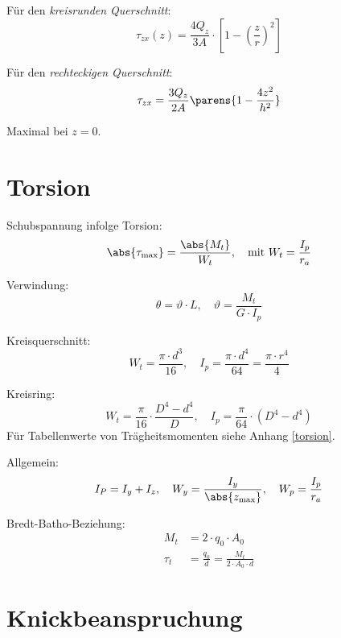 	Für den \emph{kreisrunden Querschnitt}:
	\begin{equation*}
		\tau_{zx}(z) = \frac{4Q_z}{3A}\cdot \left[ 1-\left( \frac{z}{r}\right)^2\right]
	\end{equation*}
	
	Für den \emph{rechteckigen Querschnitt}:
	\[
		\tau_{zx} = \frac{3 Q_z}{2A} \parens{1-\frac{4z^2}{h^2}}
	\]
	
	Maximal bei $z=0$.
	
\section{Torsion} %
	Schubspannung infolge Torsion:
	\begin{equation*}
		\abs{\tau_{\text{max}}} = \frac{\abs{M_t}}{W_t}, \quad \text{mit } W_t = \frac{I_p}{r_a}
	\end{equation*}
	
	Verwindung:
	\begin{equation*}
		\theta = \vartheta \cdot L , \quad \vartheta = \frac{M_t}{G\cdot I_p}
	\end{equation*}
	
	Kreisquerschnitt:
	\begin{equation*}
		W_t = \frac{\pi \cdot d^3}{16}, \quad I_p = \frac{\pi \cdot d^4}{64}=\frac{\pi \cdot r^4}{4}
	\end{equation*}
	
	Kreisring:
	\begin{equation*}
		W_t = \frac{\pi}{16}\cdot\frac{D^4-d^4}{D}, \quad I_p = \frac{\pi}{64}\cdot (D^4 -d^4)
	\end{equation*}
	Für Tabellenwerte von Trägheitsmomenten siehe Anhang \ref{torsion}.
	
	Allgemein:
	\begin{equation*}
		I_P = I_y + I_z, \quad W_y = \frac{I_y}{\abs{z_{\text{max}}}}, \quad W_p = \frac{I_p}{r_a}
	\end{equation*}
	
	Bredt-Batho-Beziehung:
	\begin{align*}
		M_t &= 2 \cdot q_0 \cdot A_0 \\
		\tau_t &= \frac{q_0}{d} = \frac{M_t}{2 \cdot A_0 \cdot d}
	\end{align*}
\section{Knickbeanspruchung} %
	
